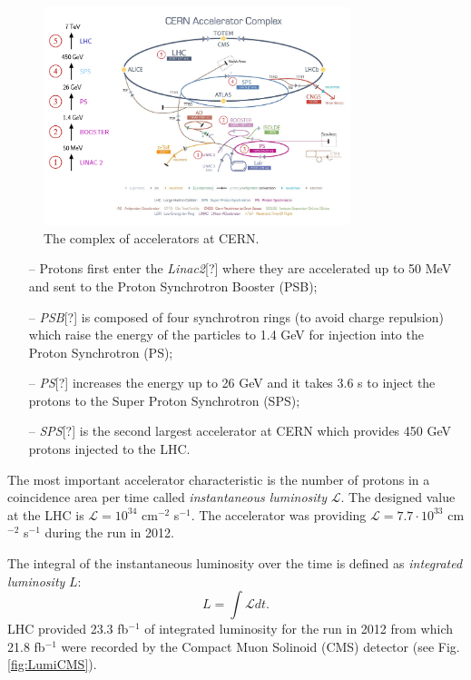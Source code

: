 \begin{figure}[t]
  \centering
  \includegraphics[width=0.8\textwidth]{02_experimental_setup/plots/Cern-Accelerator-Complex-2.png}
  \caption{The complex of accelerators at CERN.}
  \label{fig:AccelCERN}
\end{figure}

\begin{itemize}
 \item[--] Protons first enter the \textit{Linac2}[?] where they are accelerated up to 50 MeV and sent to the Proton Synchrotron Booster (PSB);
 \item[--] \textit{PSB}[?] is composed of four synchrotron rings (to avoid charge repulsion) which raise the energy of the particles to 1.4 GeV
 for injection into the Proton Synchrotron (PS);
 \item[--] \textit{PS}[?] increases the energy up to 26 GeV and it takes 3.6 s to inject the protons to the Super Proton Synchrotron (SPS); 
 \item[--] \textit{SPS}[?] is the second largest accelerator at CERN which provides 450 GeV protons injected to the LHC.
\end{itemize}

The most important accelerator characteristic is the number of protons 
in a coincidence area per time called \textit{instantaneous luminosity} $\mathcal{L}$. The designed value 
at the LHC is $\mathcal{L} = 10^{34}$ cm$^{-2}$ s$^{-1}$. The accelerator was providing $\mathcal{L} = 7.7 \cdot 10^{33}$ cm$^{-2}$ s$^{-1}$
during the run in 2012.

The integral of the instantaneous luminosity over the time
is defined as \textit{integrated luminosity} $L$: 
\begin{equation}\label{eq:lumi}
  L  = \int\mathcal{L}dt.
\end{equation}
LHC provided 23.3 fb$^{-1}$ of integrated luminosity for the run in 2012 from which 21.8 fb$^{-1}$ were
recorded by the Compact Muon Solinoid (CMS) detector (see Fig.\ref{fig:LumiCMS}).

